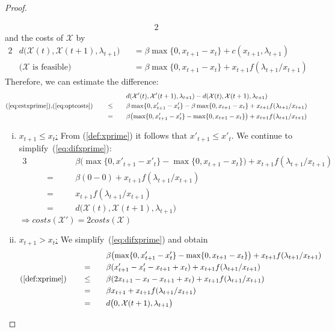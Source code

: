 \documentclass[hidelinks]{article}
\theoremstyle{plain}
\theoremstyle{definition}
\theoremstyle{rem}
\newcommand{\mx}{\mathcal{X}}
\begin{document}
\begin{sloppypar}
\begin{proof}
\begin{enumerate}
\begin{alignat}{2}
	\end{alignat}
	and the costs of $\mx$ by
	\begin{alignat}{2}
		&d\bigl(\mx(t),\mx(t+1),\lambda_{t+1}\bigr)&&=\beta\max\{0,x_{t+1}-x_t\}+c(x_{t+1},\lambda_{t+1})\nonumber\\
		&\text{($\mx$ is feasible)}&&=\beta\max\{0,x_{t+1}-x_t\}+x_{t+1}f(\lambda_{t+1}/x_{t+1})\label{eq:optcosts}
	\end{alignat}
	Therefore, we can estimate the difference:
	\begin{alignat}{3}
		&&&&&d(\mx'(t),\mx'(t+1),\lambda_{t+1})-d(\mx(t),\mx(t+1),\lambda_{t+1})\nonumber\\
		&\text{(\ref{eq:estxprime}),(\ref{eq:optcosts})}\quad&&\le\quad&&\beta\max\{0,x'_{t+1}-x'_t\}-\beta\max\{0,x_{t+1}-x_t\}+x_{t+1}f(\lambda_{t+1}/x_{t+1})\nonumber\\
		&&&=&&\beta\bigl(\max\{0,x'_{t+1}-x'_t\}-\max\{0,x_{t+1}-x_t\}\bigr)+x_{t+1}f(\lambda_{t+1}/x_{t+1})\label{eq:difxprime}
	\end{alignat}
	\begin{enumerate}[(i)]
		\item \underline{$x_{t+1}\le x_{t}$:}
			From (\ref{def:xprime}) it follows that $x'_{t+1}\le x'_{t}$. We continue to simplify~(\ref{eq:difxprime}):
		\begin{alignat*}{3}
			&&&&&\beta\bigl(\max\{0,x'_{t+1}-x'_t\}-\max\{0,x_{t+1}-x_t\}\bigr)+x_{t+1}f(\lambda_{t+1}/x_{t+1})\\
			&&&=\quad&&\beta(0-0)+x_{t+1}f(\lambda_{t+1}/x_{t+1})\\
			&&&=&&x_{t+1}f(\lambda_{t+1}/x_{t+1})\\
			&&&=&&d\bigl(\mx(t),\mx(t+1),\lambda_{t+1}\bigr)
		\end{alignat*}
		$\Rightarrow costs(\mx')=2costs(\mx)$
		\item \underline{$x_{t+1} > x_{t}$:}
		We simplify~(\ref{eq:difxprime}) and obtain
		\begin{alignat*}{3}
			&&&&&\beta\bigl(\max\{0,x'_{t+1}-x'_t\}-\max\{0,x_{t+1}-x_t\}\bigr)+x_{t+1}f(\lambda_{t+1}/x_{t+1})\\
			&&&=\quad&&\beta(x'_{t+1}-x'_t-x_{t+1}+x_t)+x_{t+1}f(\lambda_{t+1}/x_{t+1})\\
			&\text{(\ref{def:xprime})}\quad&&\le&&\beta(2x_{t+1}-x_t-x_{t+1}+x_t)+x_{t+1}f(\lambda_{t+1}/x_{t+1})\\
			&&&=&&\beta x_{t+1}+x_{t+1}f(\lambda_{t+1}/x_{t+1})\\
			&&&=&&d\bigl(0,\mx(t+1),\lambda_{t+1}\bigr)\\

\end{alignat*}
\end{enumerate}
\end{enumerate}
\end{proof}
\end{sloppypar}
\end{document}
